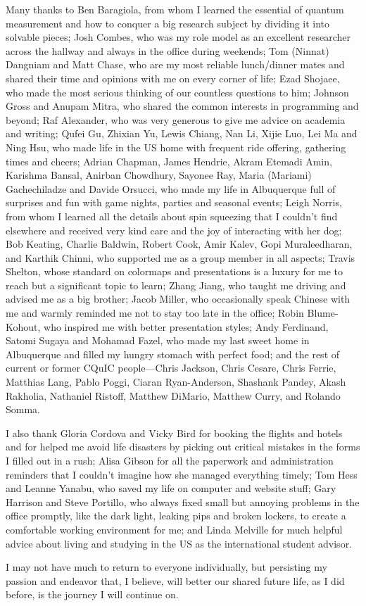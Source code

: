 \begin{acknowledgments}
Many thanks to Ben Baragiola, from whom I learned the essential of quantum measurement and how to conquer a big research subject by dividing it into solvable pieces; Josh Combes, who was my role model as an excellent researcher across the hallway and always in the office during weekends; Tom (Ninnat) Dangniam and Matt Chase, who are my most reliable lunch/dinner mates and shared their time and opinions with me on every corner of life; Ezad Shojaee, who made the most serious thinking of our countless questions to him; Johnson Gross and Anupam Mitra, who shared the common interests in programming and beyond; Raf Alexander, who was very generous to give me advice on academia and writing; Qufei Gu, Zhixian Yu, Lewis Chiang, Nan Li, Xijie Luo, Lei Ma and Ning Hsu, who made life in the US home with frequent ride offering, gathering times and cheers; Adrian Chapman, James Hendrie, Akram Etemadi Amin, Karishma Bansal, Anirban Chowdhury, Sayonee Ray, Maria (Mariami) Gachechiladze and Davide Orsucci, who made my life in Albuquerque full of surprises and fun with game nights, parties and seasonal events; Leigh Norris, from whom I learned all the details about spin squeezing that I couldn't find elsewhere and received very kind care and the joy of interacting with her dog; Bob Keating, Charlie Baldwin, Robert Cook, Amir Kalev, Gopi Muraleedharan, and Karthik Chinni, who supported me as a group member in all aspects; Travis Shelton, whose standard on colormaps and presentations is a luxury for me to reach but a significant topic to learn; Zhang Jiang, who taught me driving and advised me as a big brother; Jacob Miller, who occasionally speak Chinese with me and warmly reminded me not to stay too late in the office; Robin Blume-Kohout, who inspired me with better presentation styles; Andy Ferdinand, Satomi Sugaya and Mohamad Fazel, who made my last sweet home in Albuquerque and filled my hungry stomach with perfect food; and the rest of current or former CQuIC people---Chris Jackson, Chris Cesare, Chris Ferrie, Matthias Lang, Pablo Poggi, Ciaran Ryan-Anderson, Shashank Pandey, Akash Rakholia, Nathaniel Ristoff, Matthew DiMario, Matthew Curry, and Rolando Somma.

I also thank Gloria Cordova and Vicky Bird for booking the flights and hotels and for helped me avoid life disasters by picking out critical mistakes in the forms I filled out in a rush; Alisa Gibson for all the paperwork and administration reminders that I couldn't imagine how she managed everything timely; Tom Hess and Leanne Yanabu, who saved my life on computer and website stuff; Gary Harrison and Steve Portillo, who always fixed small but annoying problems in the office promptly, like the dark light, leaking pips and broken lockers, to create a comfortable working environment for me; and Linda Melville for much helpful advice about living and studying in the \hbox{US} as the international student advisor.

I may not have much to return to everyone individually, but persisting my passion and endeavor that, I believe, will better our shared future life, as I did before, is the journey I will continue on.
\end{acknowledgments} 